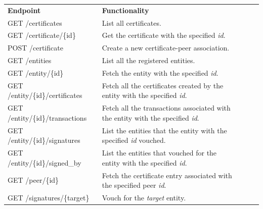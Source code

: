 {\renewcommand{\arraystretch}{2}%
\begin{table}[]
  \centering
  \begin{tabular}{|l|l|lll}
    \cline{1-2}
    \textbf{Endpoint}               & \textbf{Functionality} &  &  &  \\ \cline{1-2}
    GET /certificates               & List all certificates.                      &  &  &  \\  \cline{1-2}

    GET /certificate/\{id\}         & Get the certificate with the specified \textit{id}.                      &  &  &  \\ \cline{1-2}

    POST /certificate               & Create a new certificate-peer association.                      &  &  &  \\ \cline{1-2}

    GET /entities                   & List all the registered entities.                      &  &  &  \\ \cline{1-2}

    GET /entity/\{id\}              & Fetch the entity with the specified \textit{id}.                      &  &  &  \\ \cline{1-2}

    GET /entity/\{id\}/certificates & Fetch all the certificates created by the entity with the specified \textit{id}.                      &  &  &  \\ \cline{1-2}

    GET /entity/\{id\}/transactions & Fetch all the transactions associated with the entity with the specified \textit{id}.                      &  &  &  \\ \cline{1-2}

    GET /entity/\{id\}/signatures   & List the entities that the entity with the specified \textit{id} vouched.                      &  &  &  \\ \cline{1-2}

    GET /entity/\{id\}/signed\_by   & List the entities that vouched for the entity with the specified \textit{id}.                      &  &  &  \\ \cline{1-2}

    GET /peer/\{id\}                & Fetch the certificate entry associated with the specified peer \textit{id}.                       &  &  &  \\ \cline{1-2}

    GET /signatures/\{target\}      & Vouch for the \textit{target} entity.                      &  &  &  \\ \cline{1-2}


\end{tabular}
\end{table}}
